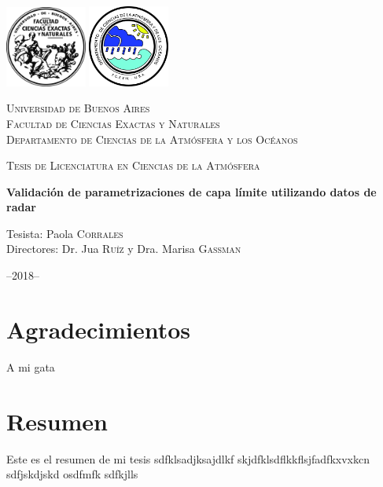\documentclass[12pt,spanish,oneside, a4paper]{book}
\title{}
\subtitle{Validación de parametrizaciones de capa límite utilizando datos de radar}
\author{Paola Corrales}
\date{}
\begin{document}
\begin{titlepage}
    \centering
    \includegraphics[width=0.2\textwidth]{logoUBA}  \hfill \includegraphics[width=0.2\textwidth]{logoDCAO} \par
    \vspace{1cm}
    {\scshape\LARGE Universidad de Buenos Aires  \\
    \large Facultad de Ciencias Exactas y Naturales \\
Departamento de Ciencias de la Atmósfera y los Océanos  \par}
    \vspace{0.5cm}
    {\scshape\Large Tesis de Licenciatura en Ciencias de la Atmósfera\par}
    \vspace{1.5cm}
    {\huge\bfseries Validación de parametrizaciones de capa límite utilizando datos de radar\par}
    \vspace{4.5cm}
    {\Large Tesista: Paola \textsc{Corrales} \\
        Directores: Dr. Jua \textsc{Ruíz} y Dra. Marisa \textsc{Gassman}
    \par}
    \vfill

    {\large --2018--\par}
\end{titlepage}

\renewcommand{\listtablename}{Índice de tablas} 
\renewcommand{\tablename}{Tabla} 

\chapter*{Agradecimientos}

A mi gata

\newpage

\chapter*{Resumen}\begin{center}\begin{minipage}{\dimexpr\paperwidth-7cm}
Este es el resumen de mi tesis sdfklsadjksajdlkf skjdfklsdflkkflsjfadfkxvxkcn  sdfjskdjskd osdfmfk sdfkjlls 
\end{minipage}
\end{center}\newpage
\end{document}

